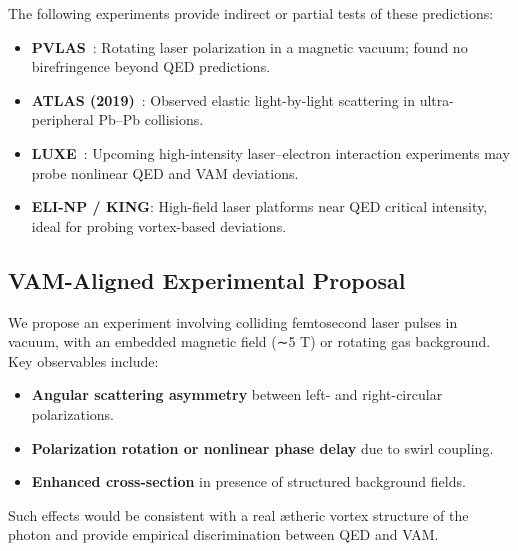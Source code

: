                 The following experiments provide indirect or partial tests of these predictions:

                \begin{itemize}
                    \item \textbf{PVLAS}~\cite{bregant2008}: Rotating laser polarization in a magnetic vacuum; found no birefringence beyond QED predictions.

                    \item \textbf{ATLAS (2019)}~\cite{atlas2019}: Observed elastic light-by-light scattering in ultra-peripheral Pb–Pb collisions.

                    \item \textbf{LUXE}~\cite{luxe2023}: Upcoming high-intensity laser–electron interaction experiments may probe nonlinear QED and VAM deviations.

                    \item \textbf{ELI-NP / KING}: High-field laser platforms near QED critical intensity, ideal for probing vortex-based deviations.
                \end{itemize}

        \subsection{VAM-Aligned Experimental Proposal}

                We propose an experiment involving colliding femtosecond laser pulses in vacuum, with an embedded magnetic field (∼5 T) or rotating gas background. Key observables include:

                \begin{itemize}
                    \item \textbf{Angular scattering asymmetry} between left- and right-circular polarizations.
                    \item \textbf{Polarization rotation or nonlinear phase delay} due to swirl coupling.
                    \item \textbf{Enhanced cross-section} in presence of structured background fields.
                \end{itemize}

                Such effects would be consistent with a real ætheric vortex structure of the photon and provide empirical discrimination between QED and VAM.